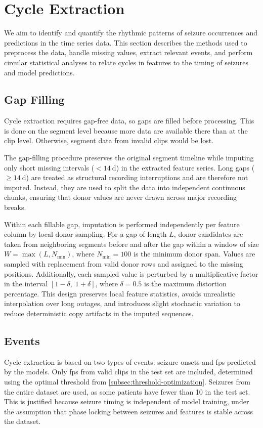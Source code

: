 

\section{Cycle Extraction} \label{sec:cycle-extraction}

We aim to identify and quantify the rhythmic patterns of seizure occurrences and predictions in the time series data.
This section describes the methods used to preprocess the data, handle missing values, extract relevant events, and perform circular statistical analyses to relate cycles in features to the timing of seizures and model predictions.

\subsection{Gap Filling} \label{subsec:gap-filling}
Cycle extraction requires gap-free data, so gaps are filled before processing.
This is done on the segment level because more data are available there than at the clip level.
Otherwise, segment data from invalid clips would be lost.

The gap-filling procedure preserves the original segment timeline while imputing only short missing intervals ($<\SI{14}{\day}$) in the extracted feature series.
Long gaps ($\geq\SI{14}{\day}$) are treated as structural recording interruptions and are therefore not imputed.
Instead, they are used to split the data into independent continuous chunks, ensuring that donor values are never drawn across major recording breaks.

Within each fillable gap, imputation is performed independently per feature column by local donor sampling.
For a gap of length $L$, donor candidates are taken from neighboring segments before and after the gap within a window of size $W=\max(L, N_{\min})$, where $N_{\min}=100$ is the minimum donor span.
Values are sampled with replacement from valid donor rows and assigned to the missing positions.
Additionally, each sampled value is perturbed by a multiplicative factor in the interval $[1-\delta,\;1+\delta]$, where $\delta=0.5$ is the maximum distortion percentage.
This design preserves local feature statistics, avoids unrealistic interpolation over long outages, and introduces slight stochastic variation to reduce deterministic copy artifacts in the imputed sequences.

\subsection{Events} \label{subsec:cycle-events}
Cycle extraction is based on two types of events: seizure onsets and \glspl{fp} predicted by the models.
Only \glspl{fp} from valid clips in the test set are included, determined using the optimal threshold from \cref{subsec:threshold-optimization}.
Seizures from the entire dataset are used, as some patients have fewer than 10 in the test set.
This is justified because seizure timing is independent of model training, under the assumption that phase locking between seizures and features is stable across the dataset.

